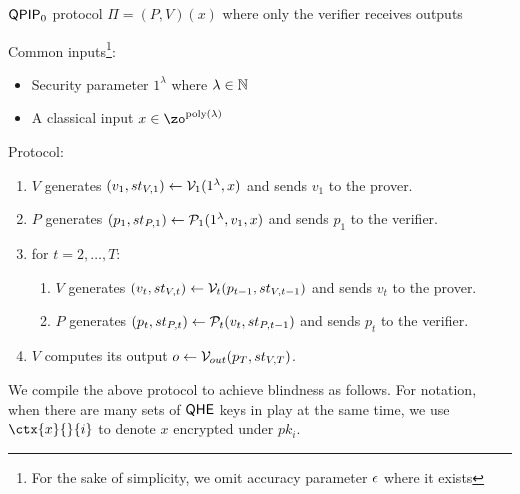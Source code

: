 \begin{protocol}{$\operatorname{\mathsf{QPIP}}_0$ protocol $\Pi=(P, V)(x)$ where only the verifier receives outputs}
    
    Common inputs\footnote{For the sake of simplicity, we omit accuracy parameter $\epsilon$ where it exists}:
    \begin{itemize}
        \item Security parameter $1^\lambda$ where $\lambda\in\mathbb{N}$
        \item A classical input $x\in\zo^{\poly(\lambda)}$
    \end{itemize}

    Protocol:
    \begin{enumerate}
        \item $V$ generates $(v_1, st_{V, 1})\leftarrow\mathcal{V}_1(1^\lambda, x)$ and sends $v_1$ to the prover.
        \item $P$ generates $(p_1, st_{P, 1})\leftarrow\mathcal{P}_1(1^\lambda, v_1, x)$ and sends $p_1$ to the verifier.
        \item for $t=2,\ldots,T$:
        \begin{enumerate}
            \item $V$ generates $(v_t, st_{V, t})\leftarrow\mathcal{V}_t(p_{t-1}, st_{V, t-1})$ and sends $v_t$ to the prover.
            \item $P$ generates $(p_t, st_{P, t})\leftarrow\mathcal{P}_t(v_t, st_{P, t-1})$ and sends $p_t$ to the verifier.
        \end{enumerate}
        \item $V$ computes its output $o\leftarrow\mathcal{V}_{out}(p_T, st_{V, T})$.
    \end{enumerate}

\end{protocol}

We compile the above protocol to achieve blindness as follows.
For notation, when there are many sets of $\mathsf{QHE}$ keys in play at the same time,
we use $\ctx{x}{}{i}$ to denote $x$ encrypted under $pk_i$.

